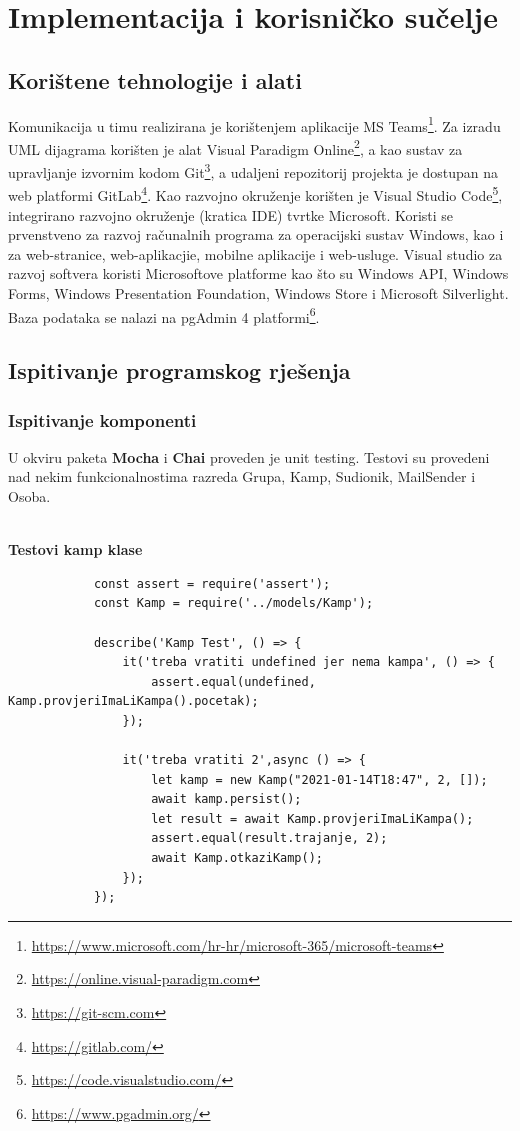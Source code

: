 
\chapter{Implementacija i korisničko sučelje}

		
		\section{Korištene tehnologije i alati}
		
Komunikacija u timu realizirana je korištenjem aplikacije MS Teams\footnote{\url{https://www.microsoft.com/hr-hr/microsoft-365/microsoft-teams}}.\newline
\indent Za izradu UML dijagrama korišten je alat Visual Paradigm Online\footnote{\url{https://online.visual-paradigm.com}}, a kao sustav za upravljanje izvornim kodom Git\footnote{\url{https://git-scm.com}}, a udaljeni repozitorij projekta je dostupan na web platformi GitLab\footnote{\url{https://gitlab.com/}}.\newline
\indent Kao razvojno okruženje korišten je Visual Studio  Code\footnote{\url{https://code.visualstudio.com/}}, integrirano razvojno okruženje (kratica IDE) tvrtke Microsoft. Koristi se prvenstveno za razvoj računalnih programa za operacijski sustav Windows, kao i za web-stranice, web-aplikacjie, mobilne aplikacije i web-usluge. Visual studio za razvoj softvera koristi Microsoftove platforme kao što su Windows API, Windows Forms, Windows Presentation Foundation, Windows Store i Microsoft Silverlight.\newline
\indent Baza podataka se nalazi na pgAdmin 4 platformi\footnote{\url{https://www.pgadmin.org/}}.\\
			
			\eject 
		
	
		\section{Ispitivanje programskog rješenja}
	
			
			\subsection{Ispitivanje komponenti}
			{U okviru paketa \textbf{Mocha} i \textbf{Chai} proveden je unit testing. Testovi su provedeni nad nekim funkcionalnostima razreda Grupa, Kamp, Sudionik, MailSender i Osoba.\\\\}
			
			\textbf{\large Testovi kamp klase}
			\begin{verbatim}
			const assert = require('assert');
			const Kamp = require('../models/Kamp');
			
			describe('Kamp Test', () => {
				it('treba vratiti undefined jer nema kampa', () => {
					assert.equal(undefined, Kamp.provjeriImaLiKampa().pocetak);
				});
				
				it('treba vratiti 2',async () => {
					let kamp = new Kamp("2021-01-14T18:47", 2, []);
					await kamp.persist();
					let result = await Kamp.provjeriImaLiKampa();
					assert.equal(result.trajanje, 2);
					await Kamp.otkaziKamp();
				});
			});
			\end{verbatim}
		
